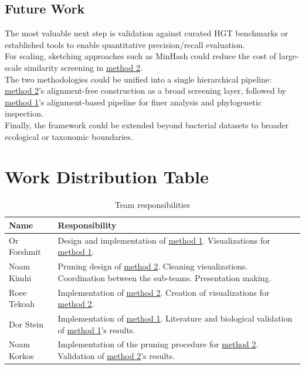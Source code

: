 \documentclass[11pt]{article}
\begin{document}
	\subsection{Future Work}
	The most valuable next step is validation against curated HGT benchmarks or established tools to enable quantitative precision/recall evaluation.\\
	For scaling, sketching approaches such as MinHash \cite{Ondov2016} could reduce the cost of large-scale similarity screening in \hyperref[subsec:method2]{method 2}.\\
	The two methodologies could be unified into a single hierarchical pipeline: \hyperref[subsec:method2]{method 2}'s alignment-free construction as a broad screening layer, followed by \hyperref[subsec:method1]{method 1}'s alignment-based pipeline for finer analysis and phylogenetic inspection.\\
	Finally, the framework could be extended beyond bacterial datasets to broader ecological or taxonomic boundaries.
	
	\section{Work Distribution Table}
	\begin{table}[H]
		\centering
		\renewcommand{\arraystretch}{1.3}
		\begin{tabularx}{\textwidth}{lX}
			\toprule
			\textbf{Name} & \textbf{Responsibility} \\
			\midrule
			Or Forshmit & Design and implementation of \hyperref[subsec:method1]{method 1}. Visualizations for \hyperref[subsec:method1]{method 1}.\\
			Noam Kimhi & Pruning design of \hyperref[subsec:method2]{method 2}. Cleaning visualizations. Coordination between the sub-teams. Presentation making. \\
			Roee Tekoah & Implementation of \hyperref[subsec:method2]{method 2}.  Creation of visualizations for \hyperref[subsec:method2]{method 2}.\\
			Dor Stein & Implementation of \hyperref[subsec:method1]{method 1}. Literature and biological validation of \hyperref[subsec:method1]{method 1}'s results. \\
			Noam Korkos & Implementation of the pruning procedure for \hyperref[subsec:method2]{method 2}. Validation of \hyperref[subsec:method2]{method 2}'s results. \\
			\bottomrule
		\end{tabularx}
		\caption{Team responsibilities}
		\label{tab:example}
	\end{table}
	
	
	\FloatBarrier
	\newpage
	
	
	
	
	
\end{document}
